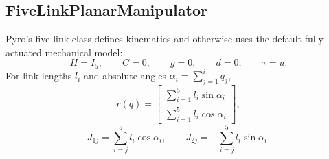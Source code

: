 \documentclass[11pt]{article}
\begin{document}
\subsection{FiveLinkPlanarManipulator}
Pyro's five-link class defines kinematics and otherwise uses the default
fully actuated mechanical model:
\begin{equation}
    H=I_5,\qquad C=0,\qquad g=0,\qquad d=0,\qquad \tau=u.
\end{equation}
For link lengths \(l_i\) and absolute angles
\(\alpha_i=\sum_{j=1}^{i}q_j\),
\begin{equation}
    r(q)=
    \begin{bmatrix}
        \sum_{i=1}^{5} l_i\sin\alpha_i\\
        \sum_{i=1}^{5} l_i\cos\alpha_i
    \end{bmatrix},
\end{equation}
\begin{equation}
    J_{1j}=\sum_{i=j}^{5}l_i\cos\alpha_i,
    \qquad
    J_{2j}=-\sum_{i=j}^{5}l_i\sin\alpha_i.
\end{equation}
\end{document}
